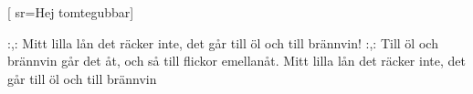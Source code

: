 [ 						
	sr={Hej tomtegubbar}]	
	
\beginverse*						
:,: Mitt lilla lån det räcker inte, det går till öl och till brännvin! :,:
Till öl och brännvin går det åt, 
och så till flickor emellanåt.
Mitt lilla lån det räcker inte, 
det går till öl och till brännvin
\endverse				
\endsong		
